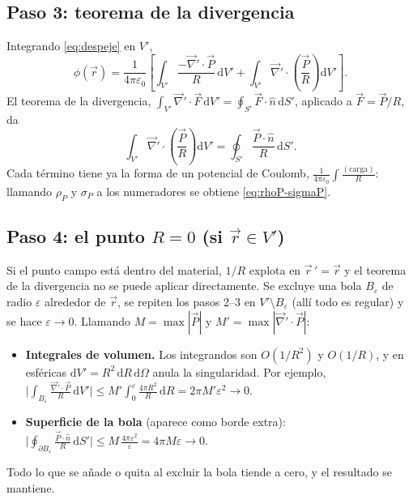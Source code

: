 \documentclass[11pt,a4paper]{article}
\numberwithin{equation}{section}
\newcommand{\vc}[1]{\vec{#1}}
\newcommand{\nab}{\vec{\nabla}}
\begin{document}
\subsection{Paso 3: teorema de la divergencia}
Integrando \eqref{eq:despeje} en $V'$,
\begin{equation}\label{eq:integrado}
  \phi(\vc{r})=\frac{1}{4\pi\varepsilon_0}\left[
  \int_{V'}\frac{-\nab'\cdot\vc{P}}{R}\,\mathrm dV'
  +\int_{V'}\nab'\cdot\!\left(\frac{\vc{P}}{R}\right)\mathrm dV'\right].
\end{equation}
El teorema de la divergencia, $\int_{V'}\nab'\cdot\vc{F}\,\mathrm dV'
=\oint_{S'}\vc{F}\cdot\hat n\,\mathrm dS'$, aplicado a $\vc{F}=\vc{P}/R$, da
\begin{equation}\label{eq:gauss}
  \int_{V'}\nab'\cdot\!\left(\frac{\vc{P}}{R}\right)\mathrm dV'
  =\oint_{S'}\frac{\vc{P}\cdot\hat n}{R}\,\mathrm dS' .
\end{equation}
Cada término tiene ya la forma de un potencial de Coulomb,
$\frac{1}{4\pi\varepsilon_0}\int\frac{(\text{carga})}{R}$: llamando $\rho_P$ y
$\sigma_P$ a los numeradores se obtiene \eqref{eq:rhoP-sigmaP}.

\subsection{Paso 4: el punto $R=0$ (si $\vc{r}\in V'$)}
Si el punto campo está dentro del material, $1/R$ explota en $\vc{r}\,'=\vc{r}$
y el teorema de la divergencia no se puede aplicar directamente. Se excluye una
bola $B_\varepsilon$ de radio $\varepsilon$ alrededor de $\vc{r}$, se repiten los
pasos 2--3 en $V'\setminus B_\varepsilon$ (allí todo es regular) y se hace
$\varepsilon\to0$. Llamando $M=\max|\vc{P}|$ y $M'=\max|\nab'\cdot\vc{P}|$:
\begin{itemize}
  \item \textbf{Integrales de volumen.} Los integrandos son $O(1/R^{2})$ y
        $O(1/R)$, y en esféricas $\mathrm dV'=R^{2}\,\mathrm dR\,\mathrm d\Omega$
        anula la singularidad. Por ejemplo,
        $\bigl|\int_{B_\varepsilon}\frac{\nab'\cdot\vc{P}}{R}\,\mathrm dV'\bigr|
        \le M'\!\int_0^{\varepsilon}\frac{4\pi R^{2}}{R}\,\mathrm dR=2\pi M'\varepsilon^{2}\to0$.
  \item \textbf{Superficie de la bola} (aparece como borde extra):
        $\bigl|\oint_{\partial B_\varepsilon}\frac{\vc{P}\cdot\hat n}{R}\,\mathrm dS'\bigr|
        \le M\,\frac{4\pi\varepsilon^{2}}{\varepsilon}=4\pi M\varepsilon\to0$.
\end{itemize}
Todo lo que se añade o quita al excluir la bola tiende a cero, y el
resultado se mantiene.
\end{document}

